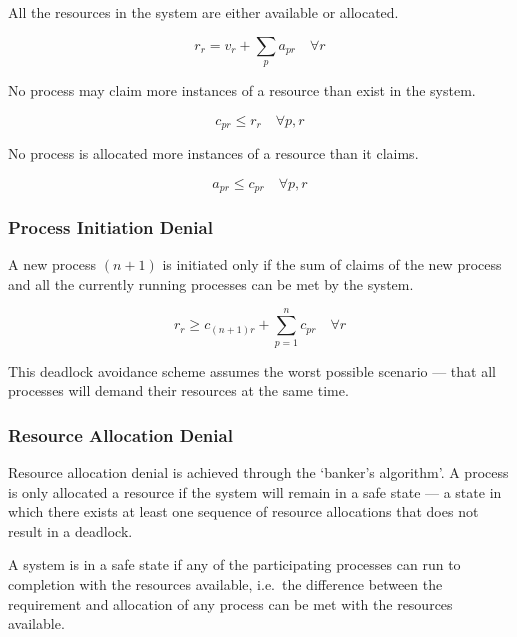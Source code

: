 All the resources in the system are either available or allocated.

\begin{equation*}
  r_r = v_r + \sum_p a_{pr} \quad \forall r
\end{equation*}

No process may claim more instances of a resource than exist in the system.

\begin{equation*}
  c_{pr} \le r_r \quad \forall p, r
\end{equation*}

No process is allocated more instances of a resource than it claims.

\begin{equation*}
  a_{pr} \le c_{pr} \quad \forall p, r
\end{equation*}

\subsubsection{Process Initiation Denial}

A new process \( \left( n + 1 \right) \) is initiated only if the sum of claims of the new process and all the currently running processes can be met by the system.

\begin{equation*}
  r_r \ge c_{\left( n + 1 \right) r} + \sum_{p = 1}^n c_{pr} \quad \forall r
\end{equation*}

This deadlock avoidance scheme assumes the worst possible scenario --- that all processes will demand their resources at the same time.

\subsubsection{Resource Allocation Denial}

Resource allocation denial is achieved through the `banker's algorithm'.
A process is only allocated a resource if the system will remain in a safe state --- a state in which there exists at least one sequence of resource allocations that does not result in a deadlock.

A system is in a safe state if any of the participating processes can run to completion with the resources available, i.e.\ the difference between the requirement and allocation of any process can be met with the resources available.

